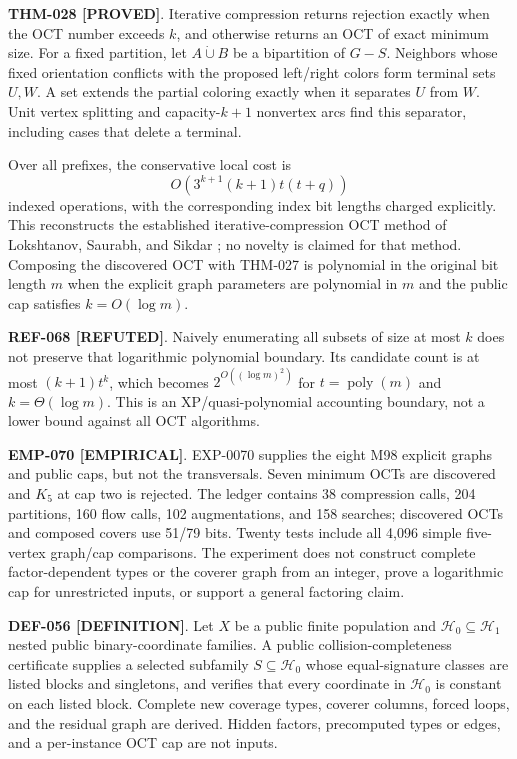 \documentclass[11pt]{article}
\newcommand{\claimstatus}[2]{\textbf{#1 [#2]}}
\begin{document}
\claimstatus{THM-028}{PROVED}. Iterative compression returns rejection
exactly when the OCT number exceeds \(k\), and otherwise returns an OCT of
exact minimum size. For a fixed partition, let \(A\dot\cup B\) be a
bipartition of \(G-S\). Neighbors whose fixed orientation conflicts with
the proposed left/right colors form terminal sets \(U,W\). A set extends
the partial coloring exactly when it separates \(U\) from \(W\). Unit
vertex splitting and capacity-\(k+1\) nonvertex arcs find this separator,
including cases that delete a terminal.

Over all prefixes, the conservative local cost is
\[
 O\!\left(3^{k+1}(k+1)t(t+q)\right)
\]
indexed operations, with the corresponding index bit lengths charged
explicitly. This reconstructs the established iterative-compression OCT
method of Lokshtanov, Saurabh, and Sikdar
\cite{lokshtanov2009oct}; no novelty is claimed for that method. Composing
the discovered OCT with THM-027 is polynomial in the original bit length
\(m\) when the explicit graph parameters are polynomial in \(m\) and the
public cap satisfies \(k=O(\log m)\).

\claimstatus{REF-068}{REFUTED}. Naively enumerating all subsets of size at
most \(k\) does not preserve that logarithmic polynomial boundary. Its
candidate count is at most \((k+1)t^k\), which becomes
\(2^{O((\log m)^2)}\) for \(t=\operatorname{poly}(m)\) and
\(k=\Theta(\log m)\). This is an XP/quasi-polynomial accounting boundary,
not a lower bound against all OCT algorithms.

\claimstatus{EMP-070}{EMPIRICAL}. EXP-0070 supplies the eight M98 explicit
graphs and public caps, but not the transversals. Seven minimum OCTs are
discovered and \(K_5\) at cap two is rejected. The ledger contains 38
compression calls, 204 partitions, 160 flow calls, 102 augmentations, and
158 searches; discovered OCTs and composed covers use 51/79 bits. Twenty
tests include all 4,096 simple five-vertex graph/cap comparisons. The
experiment does not construct complete factor-dependent types or the
coverer graph from an integer, prove a logarithmic cap for unrestricted
inputs, or support a general factoring claim.

\claimstatus{DEF-056}{DEFINITION}. Let \(X\) be a public finite population
and \(\mathcal H_0\subseteq\mathcal H_1\) nested public binary-coordinate
families. A public collision-completeness certificate supplies a selected
subfamily \(S\subseteq\mathcal H_0\) whose equal-signature classes are
listed blocks and singletons, and verifies that every coordinate in
\(\mathcal H_0\) is constant on each listed block. Complete new coverage
types, coverer columns, forced loops, and the residual graph are derived.
Hidden factors, precomputed types or edges, and a per-instance OCT cap are
not inputs.
\end{document}
